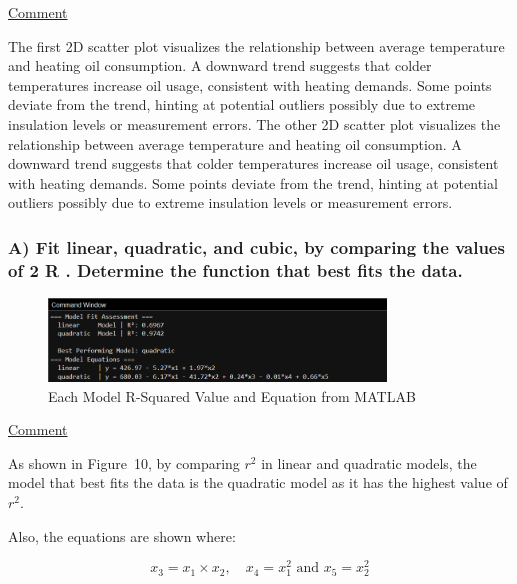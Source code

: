 \documentclass[12pt]{article}
\begin{document}
\newpage
\begin{adjustwidth}{0cm}{0cm}
\uline{Comment}
\end{adjustwidth}
The first 2D scatter plot visualizes the relationship between average temperature and
heating oil consumption. A downward trend suggests that colder temperatures increase oil
usage, consistent with heating demands. Some points deviate from the trend, hinting at
potential outliers possibly due to extreme insulation levels or measurement errors.
The other 2D scatter plot visualizes the relationship between average temperature and
heating oil consumption. A downward trend suggests that colder temperatures increase oil
usage, consistent with heating demands. Some points deviate from the trend, hinting at
potential outliers possibly due to extreme insulation levels or measurement errors.


\subsubsection*{A) Fit linear, quadratic, and cubic, by comparing the values of 2 R . Determine the
function that best fits the data.}

\begin{figure}[H]
    \centering
    \includegraphics[width=0.8\textwidth]{10.png}
    \caption{Each Model R-Squared Value and Equation from MATLAB}
\end{figure}
\begin{adjustwidth}{0cm}{0cm}
\uline{Comment}
\end{adjustwidth}
As shown in Figure~10, by comparing \( r^2 \) in linear and quadratic models, the model that best fits the data is the quadratic model as it has the highest value of \( r^2 \). \\
\begin{adjustwidth}{0cm}{0cm}
Also, the equations are shown where:
\end{adjustwidth}
\[
x_3 = x_1 \times x_2, \quad x_4 = x_1^2 \text{ and } x_5 = x_2^2
\]
\end{document}
